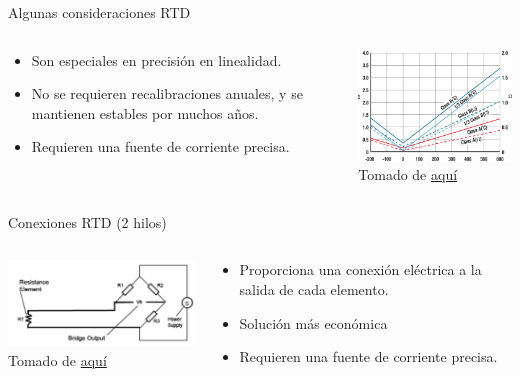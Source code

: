 \documentclass[aspectratio=169]{beamer}
\begin{document}
\begin{frame}{Algunas consideraciones RTD}
    \begin{columns}[c, onlytextwidth]
    \begin{column}{0.55\textwidth}
            \begin{itemize}
                \item Son especiales en precisión en linealidad.      
                \item No se requieren recalibraciones anuales, y se mantienen estables por muchos años. 
                \item Requieren una fuente de corriente precisa. 
            \end{itemize}
        \end{column}
        \begin{column}{0.45\textwidth}
        \includegraphics[width=6.5cm]{fig/RTD Curve.jpg}
            \\ \tiny{Tomado de \href{http://www.bearingsensor.com/bearing-rtd.html}{aquí}}
            
        \end{column}
        
    \end{columns}
\end{frame}
\begin{frame}{Conexiones RTD (2 hilos)}
    \begin{columns}[c, onlytextwidth]
    \begin{column}{0.50\textwidth}
        \includegraphics[width=7cm]{fig/2hilosRTD.PNG}
            \\ \tiny{Tomado de \href{http://www.bearingsensor.com/bearing-rtd.html}{aquí}}
            
        \end{column}
    \begin{column}{0.55\textwidth}
            \begin{itemize}
                \item Proporciona una conexión eléctrica a la salida de cada elemento.     
                \item Solución más económica
                \item Requieren una fuente de corriente precisa. 
            \end{itemize}
        \end{column}
    \end{columns}
\end{frame}
\end{document}
